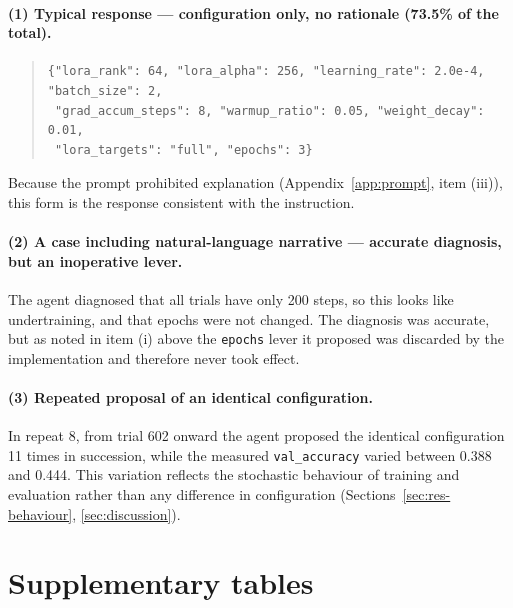 \paragraph{(1) Typical response --- configuration only, no rationale (73.5\% of
the total).}

\begin{quote}
\footnotesize
\begin{verbatim}
{"lora_rank": 64, "lora_alpha": 256, "learning_rate": 2.0e-4, "batch_size": 2,
 "grad_accum_steps": 8, "warmup_ratio": 0.05, "weight_decay": 0.01,
 "lora_targets": "full", "epochs": 3}
\end{verbatim}
\end{quote}

\noindent
Because the prompt prohibited explanation (Appendix~\ref{app:prompt}, item (iii)),
this form is the response consistent with the instruction.

\paragraph{(2) A case including natural-language narrative --- accurate diagnosis,
but an inoperative lever.}
The agent diagnosed that all trials have only 200 steps, so this looks like
undertraining, and that epochs were not changed. The diagnosis was accurate, but
as noted in item (i) above the \texttt{epochs} lever it proposed was discarded by
the implementation and therefore never took effect.

\paragraph{(3) Repeated proposal of an identical configuration.}
In repeat 8, from trial 602 onward the agent proposed the identical configuration
11 times in succession, while the measured \texttt{val\_accuracy} varied between
0.388 and 0.444. This variation reflects the stochastic behaviour of training and
evaluation rather than any difference in configuration
(Sections~\ref{sec:res-behaviour}, \ref{sec:discussion}).

\section{Supplementary tables}
\label{app:tables}

